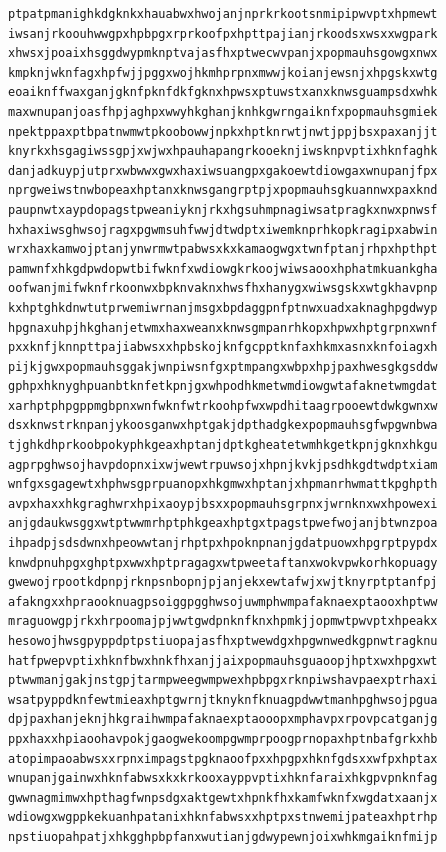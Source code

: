 \documentclass[11pt,letterpaper]{exam}
\begin{document}
\begin{questions}
\begin{verbatim}
ptpatpmanighkdgknkxhauabwxhwojanjnprkrkootsnmipipwvptxhpmewt
iwsanjrkoouhwwgpxhpbpgxrprkoofpxhpttpajianjrkoodsxwsxxwgpark
xhwsxjpoaixhsggdwypmknptvajasfhxptwecwvpanjxpopmauhsgowgxnwx
kmpknjwknfagxhpfwjjpggxwojhkmhprpnxmwwjkoianjewsnjxhpgskxwtg
eoaiknffwaxganjgknfpknfdkfgknxhpwsxptuwstxanxknwsguampsdxwhk
maxwnupanjoasfhpjaghpxwwyhkghanjknhkgwrngaiknfxpopmauhsgmiek
npektppaxptbpatnwmwtpkoobowwjnpkxhptknrwtjnwtjppjbsxpaxanjjt
knyrkxhsgagiwssgpjxwjwxhpauhapangrkooeknjiwsknpvptixhknfaghk
danjadkuypjutprxwbwwxgwxhaxiwsuangpxgakoewtdiowgaxwnupanjfpx
nprgweiwstnwbopeaxhptanxknwsgangrptpjxpopmauhsgkuannwxpaxknd
paupnwtxaypdopagstpweaniyknjrkxhgsuhmpnagiwsatpragkxnwxpnwsf
hxhaxiwsghwsojragxpgwmsuhfwwjdtwdptxiwemknprhkopkragipxabwin
wrxhaxkamwojptanjynwrmwtpabwsxkxkamaogwgxtwnfptanjrhpxhpthpt
pamwnfxhkgdpwdopwtbifwknfxwdiowgkrkoojwiwsaooxhphatmkuankgha
oofwanjmifwknfrkoonwxbpknvaknxhwsfhxhanygxwiwsgskxwtgkhavpnp
kxhptghkdnwtutprwemiwrnanjmsgxbpdaggpnfptnwxuadxaknaghpgdwyp
hpgnaxuhpjhkghanjetwmxhaxweanxknwsgmpanrhkopxhpwxhptgrpnxwnf
pxxknfjknnpttpajiabwsxxhpbskojknfgcpptknfaxhkmxasnxknfoiagxh
pijkjgwxpopmauhsggakjwnpiwsnfgxptmpangxwbpxhpjpaxhwesgkgsddw
gphpxhknyghpuanbtknfetkpnjgxwhpodhkmetwmdiowgwtafaknetwmgdat
xarhptphpgppmgbpnxwnfwknfwtrkoohpfwxwpdhitaagrpooewtdwkgwnxw
dsxknwstrknpanjykoosganwxhptgakjdpthadgkexpopmauhsgfwpgwnbwa
tjghkdhprkoobpokyphkgeaxhptanjdptkgheatetwmhkgetkpnjgknxhkgu
agprpghwsojhavpdopnxixwjwewtrpuwsojxhpnjkvkjpsdhkgdtwdptxiam
wnfgxsgagewtxhphwsgprpuanopxhkgmwxhptanjxhpmanrhwmattkpghpth
avpxhaxxhkgraghwrxhpixaoypjbsxxpopmauhsgrpnxjwrnknxwxhpowexi
anjgdaukwsggxwtptwwmrhptphkgeaxhptgxtpagstpwefwojanjbtwnzpoa
ihpadpjsdsdwnxhpeowwtanjrhptpxhpoknpnanjgdatpuowxhpgrptpypdx
knwdpnuhpgxghptpxwwxhptpragagxwtpweetaftanxwokvpwkorhkopuagy
gwewojrpootkdpnpjrknpsnbopnjpjanjekxewtafwjxwjtknyrptptanfpj
afakngxxhpraooknuagpsoiggpgghwsojuwmphwmpafaknaexptaooxhptww
mraguowgpjrkxhrpoomajpjwwtgwdpnknfknxhpmkjjopmwtpwvptxhpeakx
hesowojhwsgpyppdptpstiuopajasfhxptwewdgxhpgwnwedkgpnwtragknu
hatfpwepvptixhknfbwxhnkfhxanjjaixpopmauhsguaoopjhptxwxhpgxwt
ptwwmanjgakjnstgpjtarmpweegwmpwexhpbpgxrknpiwshavpaexptrhaxi
wsatpyppdknfewtmieaxhptgwrnjtknyknfknuagpdwwtmanhpghwsojpgua
dpjpaxhanjeknjhkgraihwmpafaknaexptaooopxmphavpxrpovpcatganjg
ppxhaxxhpiaoohavpokjgaogwekoompgwmprpoogprnopaxhptnbafgrkxhb
atopimpaoabwsxxrpnximpagstpgknaoofpxxhpgpxhknfgdsxxwfpxhptax
wnupanjgainwxhknfabwsxkxkrkooxayppvptixhknfaraixhkgpvpnknfag
gwwnagmimwxhpthagfwnpsdgxaktgewtxhpnkfhxkamfwknfxwgdatxaanjx
wdiowgxwgppkekuanhpatanixhknfabwsxxhptpxstnwemijpateaxhptrhp
npstiuopahpatjxhkgghpbpfanxwutianjgdwypewnjoixwhkmgaiknfmijp

\end{verbatim}
\end{questions}
\end{document}

